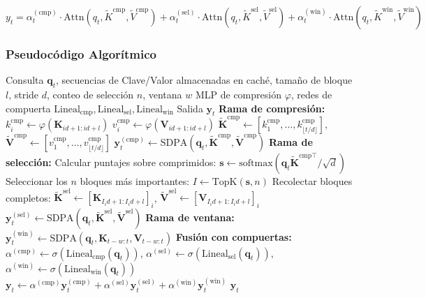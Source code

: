 \[
y_t = \alpha_t^{(\text{cmp})} \cdot \text{Attn}(q_t, \tilde{K}^{\text{cmp}}, \tilde{V}^{\text{cmp}}) + \alpha_t^{(\text{sel})} \cdot \text{Attn}(q_t, \tilde{K}^{\text{sel}}, \tilde{V}^{\text{sel}}) + \alpha_t^{(\text{win})} \cdot \text{Attn}(q_t, \tilde{K}^{\text{win}}, \tilde{V}^{\text{win}})
\]

\subsubsection{Pseudocódigo Algorítmico}

\begin{algorithm}[H]
\caption{NSA: Ramas Comprimida + Seleccionada + Ventana con Compuertas Aprendidas}
\begin{algorithmic}[1]
\Require Consulta $\mathbf{q}_t$, secuencias de Clave/Valor almacenadas en caché, tamaño de bloque $l$, stride $d$, conteo de selección $n$, ventana $w$
\Require MLP de compresión $\varphi$, redes de compuerta $\text{Lineal}_{\text{cmp}}, \text{Lineal}_{\text{sel}}, \text{Lineal}_{\text{win}}$
\Ensure Salida $\mathbf{y}_t$
\State \textbf{Rama de compresión:}
    \State $k_i^{\text{cmp}} \gets \varphi(\mathbf{K}_{id+1:id+l})$ 
    \State $v_i^{\text{cmp}} \gets \varphi(\mathbf{V}_{id+1:id+l})$
\EndFor
\State $\tilde{\mathbf{K}}^{\text{cmp}} \gets [k_1^{\text{cmp}}, \ldots, k_{\lfloor t/d \rfloor}^{\text{cmp}}]$, $\tilde{\mathbf{V}}^{\text{cmp}} \gets [v_1^{\text{cmp}}, \ldots, v_{\lfloor t/d \rfloor}^{\text{cmp}}]$
\State $\mathbf{y}_t^{(\text{cmp})} \gets \text{SDPA}(\mathbf{q}_t, \tilde{\mathbf{K}}^{\text{cmp}}, \tilde{\mathbf{V}}^{\text{cmp}})$
\State \textbf{Rama de selección:}
\State Calcular puntajes sobre comprimidos: $\mathbf{s} \gets \text{softmax}(\mathbf{q}_t \tilde{\mathbf{K}}^{\text{cmp}\top} / \sqrt{d})$
\State Seleccionar los $n$ bloques más importantes: $I \gets \mathrm{TopK}(\mathbf{s}, n)$
\State Recolectar bloques completos: $\tilde{\mathbf{K}}^{\text{sel}} \gets [\mathbf{K}_{I_i d+1:I_i d+l}]_i$, $\tilde{\mathbf{V}}^{\text{sel}} \gets [\mathbf{V}_{I_i d+1:I_i d+l}]_i$
\State $\mathbf{y}_t^{(\text{sel})} \gets \text{SDPA}(\mathbf{q}_t, \tilde{\mathbf{K}}^{\text{sel}}, \tilde{\mathbf{V}}^{\text{sel}})$
\State \textbf{Rama de ventana:}
\State $\mathbf{y}_t^{(\text{win})} \gets \text{SDPA}(\mathbf{q}_t, \mathbf{K}_{t-w:t}, \mathbf{V}_{t-w:t})$
\State \textbf{Fusión con compuertas:}
\State $\alpha^{(\text{cmp})} \gets \sigma(\text{Lineal}_{\text{cmp}}(\mathbf{q}_t))$, $\alpha^{(\text{sel})} \gets \sigma(\text{Lineal}_{\text{sel}}(\mathbf{q}_t))$, $\alpha^{(\text{win})} \gets \sigma(\text{Lineal}_{\text{win}}(\mathbf{q}_t))$
\State $\mathbf{y}_t \gets \alpha^{(\text{cmp})} \mathbf{y}_t^{(\text{cmp})} + \alpha^{(\text{sel})} \mathbf{y}_t^{(\text{sel})} + \alpha^{(\text{win})} \mathbf{y}_t^{(\text{win})}$
\Return $\mathbf{y}_t$
\end{algorithmic}
\end{algorithm}

